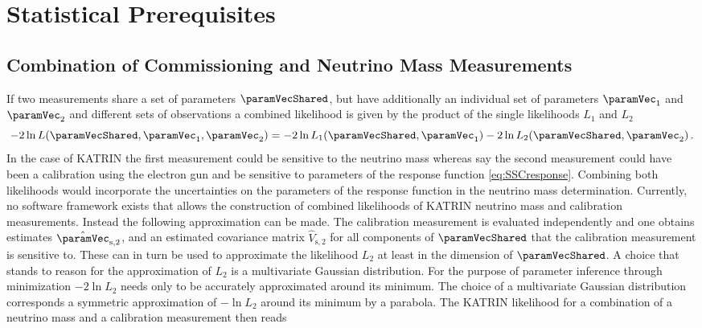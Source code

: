\def\currentRootFolder{chapter/sensitivityStudyWithPreliminaryKatrinElossModel/statisticalPrerequisites}
\def\currentFigureFolder{\currentRootFolder/fig}



\section{Statistical Prerequisites}
\subsection{Combination of Commissioning and Neutrino Mass Measurements}
If two measurements share a set of parameters $\paramVecShared$, but have additionally an individual set of parameters $\paramVec_1$ and $\paramVec_2$ and different sets of observations a combined likelihood is given by the product of the single likelihoods $L_1$ and $L_2$
\begin{equation}
-2\ln L(\paramVecShared, \paramVec_1, \paramVec_2) =  
-2\ln L_1(\paramVecShared, \paramVec_1)
-2\ln L_2(\paramVecShared, \paramVec_2)
\fullstop
\end{equation}
In the case of KATRIN the first measurement could be sensitive to the neutrino mass whereas say the second measurement could have been a calibration using the electron gun and be sensitive to parameters of the response function \eqref{eq:SSCresponse}. Combining both likelihoods would incorporate the uncertainties on the parameters of the response function in the neutrino mass determination. Currently, no software framework exists that allows the construction of combined likelihoods of KATRIN neutrino mass and calibration measurements. Instead the following approximation can be made. The calibration measurement is evaluated independently and one obtains estimates $\hat{\paramVec}_\mathrm{s,2}$, and an estimated covariance matrix $\hat{V}_\mathrm{s,2}$ for all components of $\paramVecShared$ that the calibration measurement is sensitive to. These can in turn be used to approximate the likelihood $L_2$ at least in the dimension of $\paramVecShared$. A choice that stands to reason for the approximation of $L_2$ is a multivariate Gaussian distribution. For the purpose of parameter inference through minimization $-2\ln L_2$ needs only to be accurately approximated around its minimum. The choice of a multivariate Gaussian distribution corresponds a symmetric approximation of $-\ln L_2$ around its minimum by a parabola. The KATRIN likelihood for a combination of a neutrino mass and a calibration measurement then reads
